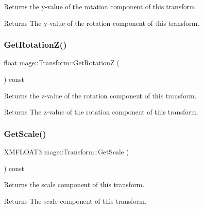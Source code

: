 Returns the y-\/value of the rotation component of this transform.

\begin{DoxyReturn}{Returns}
The y-\/value of the rotation component of this transform. 
\end{DoxyReturn}
\hypertarget{structmage_1_1_transform_ae1dd099e12e6dedadbc31d679343b39a}{}\label{structmage_1_1_transform_ae1dd099e12e6dedadbc31d679343b39a} 
\subsubsection{\texorpdfstring{Get\+Rotation\+Z()}{GetRotationZ()}}
{\footnotesize\ttfamily float mage\+::\+Transform\+::\+Get\+RotationZ (\begin{DoxyParamCaption}{ }\end{DoxyParamCaption}) const}

Returns the z-\/value of the rotation component of this transform.

\begin{DoxyReturn}{Returns}
The z-\/value of the rotation component of this transform. 
\end{DoxyReturn}
\hypertarget{structmage_1_1_transform_a38234d822ee1ffbbcfb2601a1d5f8475}{}\label{structmage_1_1_transform_a38234d822ee1ffbbcfb2601a1d5f8475} 
\subsubsection{\texorpdfstring{Get\+Scale()}{GetScale()}}
{\footnotesize\ttfamily X\+M\+F\+L\+O\+A\+T3 mage\+::\+Transform\+::\+Get\+Scale (\begin{DoxyParamCaption}{ }\end{DoxyParamCaption}) const}

Returns the scale component of this transform.

\begin{DoxyReturn}{Returns}
The scale component of this transform. 
\end{DoxyReturn}
\hypertarget{structmage_1_1_transform_ab78050be41abf1ab36d969d5235f97e2}{}\label{structmage_1_1_transform_ab78050be41abf1ab36d969d5235f97e2} 
